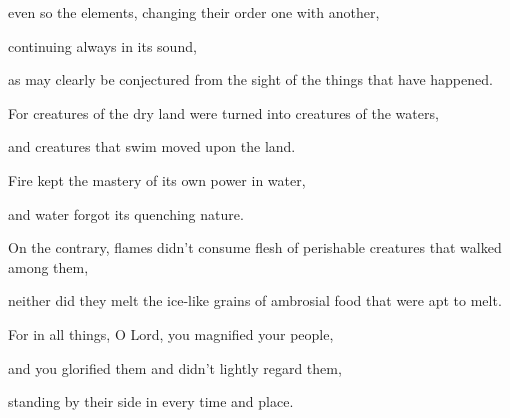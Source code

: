{\par }{\QB even so the elements, changing their order one with another,
\par }{\QB continuing always in its sound,
\par }{\QB as may clearly be conjectured from the sight of the things that have happened.
\par }{\Q {}For creatures of the dry land were turned into creatures of the waters,
\par }{\QB and creatures that swim moved upon the land.
\par }{\Q {}Fire kept the mastery of its own power in water,
\par }{\QB and water forgot its quenching nature.
\par }{\Q {}On the contrary, flames didn’t consume flesh of perishable creatures that walked among them,
\par }{\QB neither did they melt the ice-like grains of ambrosial food that were apt to melt.
\par }{\Q {}For in all things, O Lord, you magnified your people,
\par }{\QB and you glorified them and didn’t lightly regard them,
\par }{\QB standing by their side in every time and place.
\par }